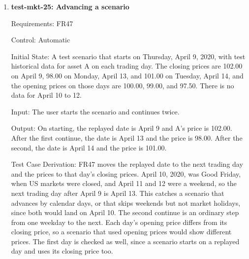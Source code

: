 \documentclass[12pt, titlepage]{article}
\begin{document}
\begin{enumerate}
Requirements: FR46

Control: Automatic

Initial State: Two test scenarios, $S_1$ and $S_2$, each including asset A at
a closing price of 100.00 on its first day. A test user with a live balance of
500 who holds 2 shares of A and has acknowledged the simulated market notice.

Input: The user starts $S_1$, buys 10 shares of A, and leaves $S_1$. The user
then starts $S_2$.

Output: On starting $S_1$, and again on starting $S_2$, the scenario balance
is 10,000 and the user holds no scenario shares.

Test Case Derivation: FR46 starts every scenario with a balance of
\texttt{SCENARIO\_START\_\allowbreak BALANCE} (10,000) and no holdings. The
user's live balance of 500 and live shares differ from these, so a scenario
that copied the live portfolio would start with 500 and 2 shares. The trade
in $S_1$ leaves a balance of 9,000 and 10 shares, so a second scenario that
carried on from the first would start with those instead.

How test will be performed: A pytest test starts each scenario, reads its
balance and holdings through the API, and sends the trade in $S_1$.

\item{\textbf{test-mkt-25: Advancing a scenario}\\}

Requirements: FR47

Control: Automatic

Initial State: A test scenario that starts on Thursday, April 9, 2020, with
test historical data for asset A on each trading day. The closing prices are
102.00 on April 9, 98.00 on Monday, April 13, and 101.00 on Tuesday, April 14,
and the opening prices on those days are 100.00, 99.00, and 97.50. There is no
data for April 10 to 12.

Input: The user starts the scenario and continues twice.

Output: On starting, the replayed date is April 9 and A's price is 102.00.
After the first continue, the date is April 13 and the price is 98.00. After
the second, the date is April 14 and the price is 101.00.

Test Case Derivation: FR47 moves the replayed date to the next trading day
and the prices to that day's closing prices. April 10, 2020, was Good Friday,
when US markets were closed, and April 11 and 12 were a weekend, so the next
trading day after April 9 is April 13. This catches a scenario that advances
by calendar days, or that skips weekends but not market holidays, since both
would land on April 10. The second continue is an ordinary step from one
weekday to the next. Each day's opening price differs from its closing price,
so a scenario that used opening prices would show different prices. The first
day is checked as well, since a scenario starts on a replayed day and uses
its closing price too.


\end{enumerate}
\end{document}
